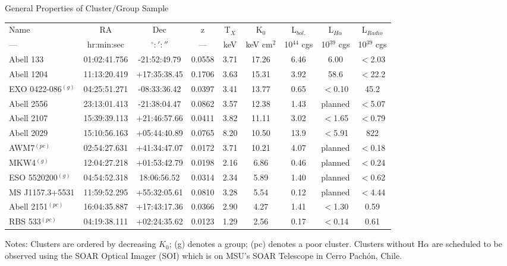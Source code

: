 \documentclass[11pt]{article}
\begin{document}
\begin{center}
General Properties of Cluster/Group Sample
\small
\begin{tabular}{lcccccccc}
\hline
Name & RA         & Dec           & z   & T$_X$ & K$_0$      & L$_{bol.}$    & L$_{H\alpha}$ & L$_{Radio}$\\
---  & hr:min:sec & $^\circ:':''$ & --- & keV   & keV cm$^2$ & 10$^{44}$ cgs & 10$^{39}$ cgs & 10$^{39}$ cgs\\
\hline
\hline
Abell 133            & 01:02:41.756 & -21:52:49.79 & 0.0558 & 3.71 & 17.26 & 6.46 & 6.00    & $<$2.03\\
Abell 1204           & 11:13:20.419 & +17:35:38.45 & 0.1706 & 3.63 & 15.31 & 3.92 & 58.6    & $<$22.2\\
EXO 0422-086$^{(g)}$ & 04:25:51.271 & -08:33:36.42 & 0.0397 & 3.41 & 13.77 & 0.65 & $<$0.10 & 45.2\\
Abell 2556           & 23:13:01.413 & -21:38:04.47 & 0.0862 & 3.57 & 12.38 & 1.43 & planned & $<$5.07\\
Abell 2107           & 15:39:39.113 & +21:46:57.66 & 0.0411 & 3.82 & 11.11 & 3.02 & $<$1.65 & $<$0.79\\
Abell 2029           & 15:10:56.163 & +05:44:40.89 & 0.0765 & 8.20 & 10.50 & 13.9 & $<$5.91 & 822\\
AWM7$^{(pc)}$        & 02:54:27.631 & +41:34:47.07 & 0.0172 & 3.71 & 10.21 & 4.07 & planned & $<$0.18\\
MKW4$^{(g)}$         & 12:04:27.218 & +01:53:42.79 & 0.0198 & 2.16 & 6.86  & 0.46 & planned & $<$0.24\\
ESO 5520200$^{(g)}$  & 04:54:52.318 &  18:06:56.52 & 0.0314 & 2.34 & 5.89  & 1.40 & planned & $<$0.62\\
MS J1157.3+5531      & 11:59:52.295 & +55:32:05.61 & 0.0810 & 3.28 & 5.54  & 0.12 & planned & $<$4.44\\
Abell 2151$^{(pc)}$  & 16:04:35.887 & +17:43:17.36 & 0.0366 & 2.90 & 4.27  & 1.41 & $<$1.30 & 0.59\\
RBS 533$^{(pc)}$     & 04:19:38.111 & +02:24:35.62 & 0.0123 & 1.29 & 2.56  & 0.17 & $<$0.14 & 0.61\\
\hline
\end{tabular}
\label{tab:sample}
\end{center}
\footnotesize
Notes: Clusters are ordered by decreasing $K_0$; (g) denotes a group;
(pc) denotes a poor cluster. Clusters without H${\alpha}$ are scheduled
to be observed using the SOAR Optical Imager (SOI) which is on MSU's
SOAR Telescope in Cerro Pach\'{o}n, Chile.\\
\normalsize
\end{document}
